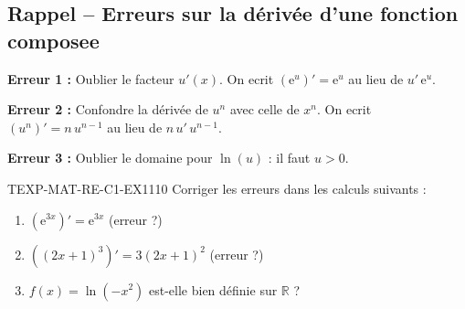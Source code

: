 

\subsection*{Rappel -- Erreurs sur la dérivée d'une fonction composee}

\textbf{Erreur 1 :} Oublier le facteur $u'(x)$. On ecrit $(\mathrm{e}^{u})' = \mathrm{e}^u$ au lieu de $u'\,\mathrm{e}^u$.

\textbf{Erreur 2 :} Confondre la dérivée de $u^n$ avec celle de $x^n$. On ecrit $(u^n)' = n\,u^{n-1}$ au lieu de $n\,u'\,u^{n-1}$.

\textbf{Erreur 3 :} Oublier le domaine pour $\ln(u)$ : il faut $u > 0$.

\begin{exercice}{TEXP-MAT-RE-C1-EX1}{1}{10}
Corriger les erreurs dans les calculs suivants :
\begin{enumerate}
  \item $\left(\mathrm{e}^{3x}\right)' = \mathrm{e}^{3x}$ \quad (erreur ?)
  \item $\left((2x+1)^3\right)' = 3(2x+1)^2$ \quad (erreur ?)
  \item $f(x) = \ln(-x^2)$ est-elle bien définie sur $\mathbb{R}$ ?
\end{enumerate}
\end{exercice}

